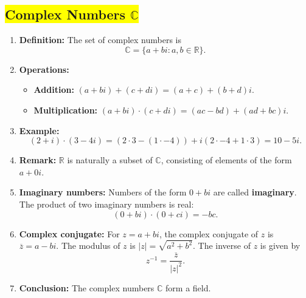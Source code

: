 \subsection*{\colorbox{yellow}{Complex Numbers $\mathbb{C}$}}
    \begin{enumerate}
        \item \textbf{Definition:} The set of complex numbers is
        \[ \mathbb{C} = \{a + bi : a, b \in \mathbb{R}\}. \]
        
        \item \textbf{Operations:}
        \begin{itemize}
            \item \textbf{Addition:} $(a + bi) + (c + di) = (a + c) + (b + d)i$.
            \item \textbf{Multiplication:} $(a + bi) \cdot (c + di) = (ac - bd) + (ad + bc)i$.
        \end{itemize}
        
        \item \textbf{Example:} 
        \[
            (2 + i) \cdot (3 - 4i) = (2 \cdot 3 - (1 \cdot -4)) + i(2 \cdot -4 + 1 \cdot 3) = 10 - 5i.
        \]

        \item \textbf{Remark:} $\mathbb{R}$ is naturally a subset of $\mathbb{C}$, consisting of elements of the form $a + 0i$.
        
        \item \textbf{Imaginary numbers:} Numbers of the form $0 + bi$ are called \textbf{imaginary}. The product of two imaginary numbers is real:
        \[
            (0 + bi) \cdot (0 + ci) = -bc.
        \]

        \item \textbf{Complex conjugate:} For $z = a + bi$, the complex conjugate of $z$ is $\overline{z} = a - bi$. The modulus of $z$ is $|z| = \sqrt{a^2 + b^2}$. The inverse of $z$ is given by
        \[
            z^{-1} = \frac{\overline{z}}{|z|^2}.
        \]

        \item \textbf{Conclusion:} The complex numbers $\mathbb{C}$ form a field.
    \end{enumerate}

